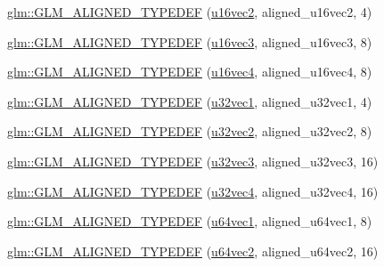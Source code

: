\begin{DoxyCompactItemize}
\hyperlink{group__gtx__type__aligned_gac01bb9fc32a1cd76c2b80d030f71df4c}{glm\+::\+G\+L\+M\+\_\+\+A\+L\+I\+G\+N\+E\+D\+\_\+\+T\+Y\+P\+E\+D\+EF} (\hyperlink{group__gtc__type__precision_ga10e8900b9610f930772aa55aee8e3121}{u16vec2}, aligned\+\_\+u16vec2, 4)
\item 
\hyperlink{group__gtx__type__aligned_ga09540dbca093793a36a8997e0d4bee77}{glm\+::\+G\+L\+M\+\_\+\+A\+L\+I\+G\+N\+E\+D\+\_\+\+T\+Y\+P\+E\+D\+EF} (\hyperlink{group__gtc__type__precision_ga947d0d003e016eaf2038d6843b427257}{u16vec3}, aligned\+\_\+u16vec3, 8)
\item 
\hyperlink{group__gtx__type__aligned_gaecafb5996f5a44f57e34d29c8670741e}{glm\+::\+G\+L\+M\+\_\+\+A\+L\+I\+G\+N\+E\+D\+\_\+\+T\+Y\+P\+E\+D\+EF} (\hyperlink{group__gtc__type__precision_ga87d1f39c523b4d6d4de0c2778afe5474}{u16vec4}, aligned\+\_\+u16vec4, 8)
\item 
\hyperlink{group__gtx__type__aligned_gac6b161a04d2f8408fe1c9d857e8daac0}{glm\+::\+G\+L\+M\+\_\+\+A\+L\+I\+G\+N\+E\+D\+\_\+\+T\+Y\+P\+E\+D\+EF} (\hyperlink{group__gtc__type__precision_ga09dd72852808c32ba398674736b9672a}{u32vec1}, aligned\+\_\+u32vec1, 4)
\item 
\hyperlink{group__gtx__type__aligned_ga1fa0dfc8feb0fa17dab2acd43e05342b}{glm\+::\+G\+L\+M\+\_\+\+A\+L\+I\+G\+N\+E\+D\+\_\+\+T\+Y\+P\+E\+D\+EF} (\hyperlink{group__gtc__type__precision_gad3a81c0d5a6941bb9ffdc9fa8611b426}{u32vec2}, aligned\+\_\+u32vec2, 8)
\item 
\hyperlink{group__gtx__type__aligned_ga0019500abbfa9c66eff61ca75eaaed94}{glm\+::\+G\+L\+M\+\_\+\+A\+L\+I\+G\+N\+E\+D\+\_\+\+T\+Y\+P\+E\+D\+EF} (\hyperlink{group__gtc__type__precision_ga16b26751ba6b83c8a0226b9834d73fdc}{u32vec3}, aligned\+\_\+u32vec3, 16)
\item 
\hyperlink{group__gtx__type__aligned_ga14fd29d01dae7b08a04e9facbcc18824}{glm\+::\+G\+L\+M\+\_\+\+A\+L\+I\+G\+N\+E\+D\+\_\+\+T\+Y\+P\+E\+D\+EF} (\hyperlink{group__gtc__type__precision_ga6e966cda0025699449a36b41f1787927}{u32vec4}, aligned\+\_\+u32vec4, 16)
\item 
\hyperlink{group__gtx__type__aligned_gab253845f534a67136f9619843cade903}{glm\+::\+G\+L\+M\+\_\+\+A\+L\+I\+G\+N\+E\+D\+\_\+\+T\+Y\+P\+E\+D\+EF} (\hyperlink{group__gtc__type__precision_gaf0a59fdb715cf4ddf0c4dabf0e2286a9}{u64vec1}, aligned\+\_\+u64vec1, 8)
\item 
\hyperlink{group__gtx__type__aligned_ga929427a7627940cdf3304f9c050b677d}{glm\+::\+G\+L\+M\+\_\+\+A\+L\+I\+G\+N\+E\+D\+\_\+\+T\+Y\+P\+E\+D\+EF} (\hyperlink{group__gtc__type__precision_gaddd85665767e5d32aee8516f00c45f59}{u64vec2}, aligned\+\_\+u64vec2, 16)

\end{DoxyCompactItemize}
